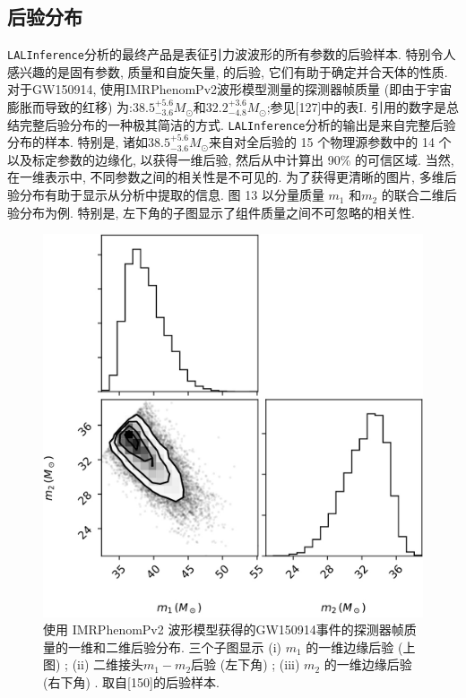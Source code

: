 \documentclass[a4paper]{\documentclassname}
\theoremstyle{definition}
\begin{document}
\subsection{后验分布}

\texttt{LALInference}分析的最终产品是表征引力波波形的所有参数的后验样本. 特别令人感兴趣的是固有参数, 质量和自旋矢量, 的后验, 它们有助于确定并合天体的性质. 对于GW150914, 使用IMRPhenomPv2波形模型测量的探测器帧质量 (即由于宇宙膨胀而导致的红移) 为:$38.5_{-3.6}^{+5.6} M_\odot$和$32.2_{-4.8}^{+3.6} M_\odot$;参见[127]中的表I. 引用的数字是总结完整后验分布的一种极其简洁的方式. \texttt{LALInference}分析的输出是来自完整后验分布的样本. 特别是, 诸如$38.5_{-3.6}^{+5.6} M_\odot$来自对全后验的 15 个物理源参数中的 14 个以及标定参数的边缘化, 以获得一维后验, 然后从中计算出 90\%{} 的可信区域. 当然, 在一维表示中, 不同参数之间的相关性是不可见的. 为了获得更清晰的图片, 多维后验分布有助于显示从分析中提取的信息. 图 13 以分量质量 $m_1$ 和$ m_2$ 的联合二维后验分布为例. 特别是, 左下角的子图显示了组件质量之间不可忽略的相关性. 
\begin{figure}[htbp]
    \centering
    \includegraphics{img/13.jpg}
    \caption{
        使用 IMRPhenomPv2 波形模型获得的GW150914事件的探测器帧质量的一维和二维后验分布. 三个子图显示  (i)  $m_1$ 的一维边缘后验 (上图) ; (ii) 二维接头$m_1 - m_2$后验 (左下角) ; (iii)  $ m_2$ 的一维边缘后验 (右下角) . 取自[150]的后验样本. 
    }
\end{figure}
\end{document}
